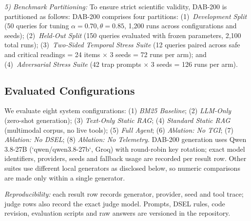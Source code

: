\documentclass[conference]{IEEEtran}
\begin{document}
\textit{5) Benchmark Partitioning:} To ensure strict scientific validity, DAB-200 is partitioned as follows:
DAB-200 comprises four partitions: (1)~\textit{Development Split} (50 queries for tuning $\alpha=0.70, \theta=0.85$, 1,200 runs across configurations and seeds); (2)~\textit{Held-Out Split} (150 queries evaluated with frozen parameters, 2,100 total runs); (3)~\textit{Two-Sided Temporal Stress Suite} (12 queries paired across safe and critical readings = 24 items $\times$ 3 seeds = 72 runs per arm); and (4)~\textit{Adversarial Stress Suite} (42 trap prompts $\times$ 3 seeds = 126 runs per arm).

\subsection{Evaluated Configurations}
We evaluate eight system configurations: (1) \textit{BM25 Baseline}; (2) \textit{LLM-Only} (zero-shot generation); (3) \textit{Text-Only Static RAG}; (4) \textit{Standard Static RAG} (multimodal corpus, no live tools); (5) \textit{Full Agent}; (6) \textit{Ablation: No TGI}; (7) \textit{Ablation: No DSEL}; (8) \textit{Ablation: No Telemetry}. DAB-200 generation uses Qwen 3.8-27B (`qwen/qwen3.8-27b`, Groq) with round-robin key rotation; exact model identifiers, providers, seeds and fallback usage are recorded per result row. Other suites use different local generators as disclosed below, so numeric comparisons are made only within a single generator.

\textit{Reproducibility:} each result row records generator, provider, seed and tool trace; judge rows also record the exact judge model. Prompts, DSEL rules, code revision, evaluation scripts and raw answers are versioned in the repository.
\end{document}
